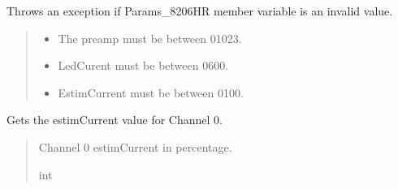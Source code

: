 \documentclass[letterpaper,10pt,english]{sphinxmanual}
\begin{document}
\begin{fulllineitems}
\begin{fulllineitems}
\label{\detokenize{Morelia.Parameters:Morelia.Parameters.Params8480SC.Params8480SC._CheckParams}}
\pysigstartsignatures
{}
\pysigstopsignatures
\sphinxAtStartPar
Throws an exception if Params\_8206HR member variable is an invalid value.
\begin{quote}\begin{description}
\begin{itemize}
\item {} 
\sphinxAtStartPar
{} \textendash{} The preamp must be between 0\sphinxhyphen{}1023.

\item {} 
\sphinxAtStartPar
{} \textendash{} Led\sphinxhyphen{}Curent must be between 0\sphinxhyphen{}600.

\item {} 
\sphinxAtStartPar
{} \textendash{} Estim\sphinxhyphen{}Current must be between 0\sphinxhyphen{}100.

\end{itemize}

\end{description}\end{quote}

\end{fulllineitems}


\begin{fulllineitems}
\label{\detokenize{Morelia.Parameters:Morelia.Parameters.Params8480SC.Params8480SC.estimCurrent_CH0}}
\pysigstartsignatures
{}
\pysigstopsignatures
\sphinxAtStartPar
Gets the estimCurrent value for Channel 0.
\begin{quote}\begin{description}
\sphinxAtStartPar
Channel 0 estimCurrent in percentage.

\sphinxAtStartPar
int

\end{description}\end{quote}


\end{fulllineitems}
\end{fulllineitems}
\end{document}
